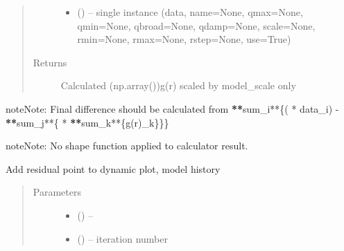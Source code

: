 \documentclass[letterpaper,10pt,english]{sphinxmanual}
\begin{document}
\begin{fulllineitems}
\begin{fulllineitems}
\begin{quote}
\begin{description}
\begin{itemize}
\item {} 
 ({\hyperref[\detokenize{rst/pairdistributionfunction:mstack.pairdistributionfunction.PdfData}]{}}) -- single instance
(data, name=None, qmax=None, qmin=None, qbroad=None, qdamp=None,
scale=None, rmin=None, rmax=None, rstep=None, use=True)

\end{itemize}

\item[{Returns}] \leavevmode
Calculated (np.array())g(r) scaled by model\_scale only

\end{description}\end{quote}

\begin{sphinxadmonition}{note}{Note:}
Final difference should be calculated from
{\color{red}\bfseries{}**}sum\_i**\{( * data\_i) - {\color{red}\bfseries{}**}sum\_j**\{ * {\color{red}\bfseries{}**}sum\_k**\{g(r)\_k\}\}\}
\end{sphinxadmonition}

\begin{sphinxadmonition}{note}{Note:}
No shape function applied to calculator result.
\end{sphinxadmonition}

\end{fulllineitems}


\begin{fulllineitems}
\label{\detokenize{rst/pairdistributionfunction:mstack.pairdistributionfunction.PdfRefinement.callback}}
Add residual point to dynamic plot, model history
\begin{quote}\begin{description}
\item[{Parameters}] \leavevmode\begin{itemize}
\item {} 
 () -- 

\item {} 
 () -- iteration number


\end{itemize}
\end{description}
\end{quote}
\end{fulllineitems}
\end{fulllineitems}
\end{document}
